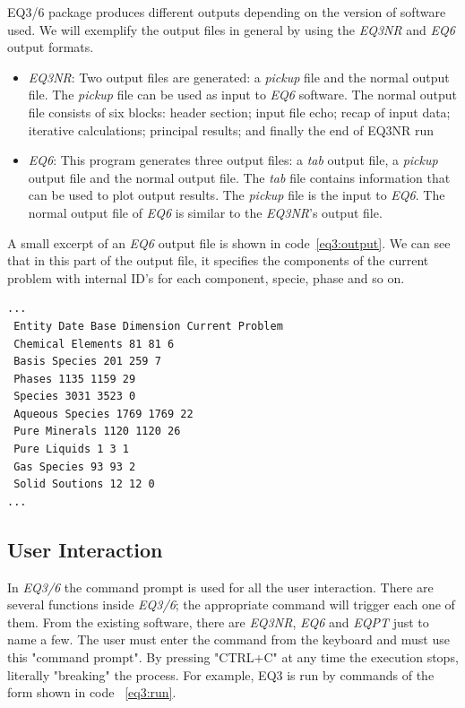 EQ3/6 package produces different outputs depending on the version of software used. We will exemplify the output files in general by using the \emph{EQ3NR} and \emph{EQ6} output formats. 
\begin{itemize}
\item \emph{EQ3NR}: Two output files are generated: a \emph{pickup} file and the normal output file. The \emph{pickup} file can be used as input to \emph{EQ6} software. The normal output file consists of six blocks: header section; input file echo; recap of input data; iterative calculations; principal results; and finally the end of EQ3NR run
\item \emph{EQ6}: This program generates three output files: a \emph{tab} output file, a \emph{pickup} output file and the normal output file. The \emph{tab} file contains information that can be used to plot output results. The \emph{pickup} file is the input to \emph{EQ6}. The normal output file of \emph{EQ6} is similar to the \emph{EQ3NR}'s output file.
\end{itemize}

A small excerpt of an \emph{EQ6} output file is shown in code~\ref{eq3:output}. We can see that in this part of the output file, it specifies the components of the current problem with internal ID's for each component, specie, phase and so on.

\begin{minipage}[c]{0.92\textwidth}
\begin{lstlisting}[frame=single, caption=Excerpt of \emph{EQ6} output file, label=eq3:output]
...
 Entity Date Base Dimension Current Problem
 Chemical Elements 81 81 6
 Basis Species 201 259 7
 Phases 1135 1159 29
 Species 3031 3523 0
 Aqueous Species 1769 1769 22
 Pure Minerals 1120 1120 26
 Pure Liquids 1 3 1
 Gas Species 93 93 2
 Solid Soutions 12 12 0
...
\end{lstlisting}
\end{minipage}

\subsection{User Interaction}
In \emph{EQ3/6} the command prompt is used for all the user interaction. There are several functions inside \emph{EQ3/6}; the appropriate command will trigger each one of them. From the existing software, there are \emph{EQ3NR}, \emph{EQ6} and \emph{EQPT} just to name a few. The user must enter the command from the keyboard and must use this "command prompt". By pressing "CTRL+C" at any time the execution stops, literally "breaking" the process. For example, EQ3 is run by commands of the form shown in code ~\ref{eq3:run}.

